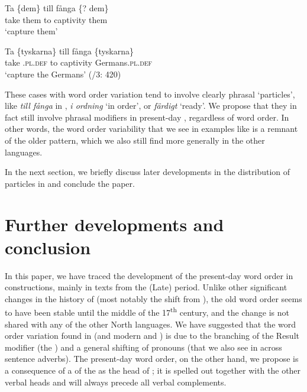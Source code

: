 \documentclass[output=paper]{langscibook}
\begin{document}
\ea\label{ex:lalu:63}
\ea
\gll Ta   \{dem\}   till   fånga       \{? dem\}\\
    take   them     to     captivity    {}   them\\
\glt `capture them'

\ex
\gll Ta   \{tyskarna\}       till   fånga     \{tyskarna\}\\
 take   \textsc{.pl.def}   to     captivity     Germans\textsc{.pl.def}\\
\glt `capture the Germans’ (\citealt{TelemanEtAl1999}/3: 420)\\
\z
\z


These cases with word order variation tend to involve clearly phrasal ‘particles’, like \textit{till fånga} in , \textit{i ordning} ‘in order’, or \textit{färdigt} ‘ready’. We propose that they in fact still involve phrasal modifiers in present-day , regardless of word order. In other words, the word order variability that we see in examples like  is a remnant of the older  pattern, which we also still find more generally in the other  languages.



In the next section, we briefly discuss later developments in the distribution of particles in  and conclude the paper.


\section{Further developments and conclusion}\label{sec:lalu:7}
In this paper, we have traced the development of the present-day  word order in  constructions, mainly in texts from the (Late)  period. Unlike other significant changes in the history of  (most notably the shift from ), the old word order seems to have been stable until the middle of the 17\textsuperscript{th} century, and the change is not shared with any of the other North  languages. We have suggested that the word order variation found in  (and modern  and ) is due to the branching of the Result modifier (the ) and a general shifting of pronouns (that we also see in  across sentence adverbs). The present-day  word order, on the other hand, we propose is a consequence of a  of the  as the head of ; it is spelled out together with the other verbal heads and will always precede all verbal complements. 
\end{document}
